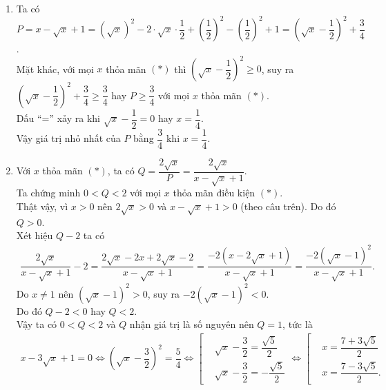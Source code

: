 \begin{bt}
{\begin{enumerate}
\begin{eqnarray*}
    &=& \dfrac{\sqrt{x}\left[(\sqrt{x})^3-1\right]}{x+\sqrt{x}+1} - \dfrac{\sqrt{x}\left(2\sqrt{x}+1\right)}{\sqrt{x}} + \dfrac{2\left(\sqrt{x}-1\right)\left(\sqrt{x}+1\right)}{\sqrt{x}-1}\\
    &=& \dfrac{\sqrt{x}\left(\sqrt{x}-1\right)\left(x+\sqrt{x}+1\right)}{x+\sqrt{x}+1} - \left(2\sqrt{x}+1\right) + 2\left(\sqrt{x}+1\right)\\
    &=& \sqrt{x}\left(\sqrt{x}-1\right)-2\sqrt{x}-1+2\sqrt{x}+2\\
    &=& x-\sqrt{x}+1.
   \end{eqnarray*}
   \item Ta có $P=x-\sqrt{x}+1 = \left(\sqrt{x}\right)^2 - 2 \cdot \sqrt{x} \cdot \dfrac{1}{2} + \left(\dfrac{1}{2}\right)^2 -  \left(\dfrac{1}{2}\right)^2 + 1 = \left(\sqrt{x}-\dfrac{1}{2}\right)^2 + \dfrac{3}{4}$.\\
   Mặt khác, với mọi $x$ thỏa mãn $(*)$ thì $\left(\sqrt{x}-\dfrac{1}{2}\right)^2 \geq 0$, suy ra $\left(\sqrt{x}-\dfrac{1}{2}\right)^2+\dfrac{3}{4} \geq \dfrac{3}{4}$ hay $P \geq \dfrac{3}{4}$ với mọi $x$ thỏa mãn $(*)$.\\
   Dấu ``='' xảy ra khi $\sqrt{x}-\dfrac{1}{2}=0$ hay $x=\dfrac{1}{4}$.\\
   Vậy giá trị nhỏ nhất của $P$ bằng $\dfrac{3}{4}$ khi $x=\dfrac{1}{4}$.
   \item Với $x$ thỏa mãn $(*)$, ta có $Q=\dfrac{2\sqrt{x}}{P} = \dfrac{2\sqrt{x}}{x-\sqrt{x}+1}$.\\
   Ta chứng minh $0<Q<2$ với mọi $x$ thỏa mãn điều kiện $(*)$.\\
   Thật vậy, vì $x>0$ nên $2\sqrt{x}>0$ và $x-\sqrt{x}+1>0$ (theo câu trên). Do đó $Q>0$.\\
   Xét hiệu $Q-2$ ta có
   \allowdisplaybreaks
   \begin{eqnarray}
   \dfrac{2\sqrt{x}}{x-\sqrt{x}+1}-2 = \dfrac{2\sqrt{x}-2x+2\sqrt{x}-2}{x-\sqrt{x}+1} = \dfrac{-2\left(x-2\sqrt{x}+1\right)}{x-\sqrt{x}+1} = \dfrac{-2\left(\sqrt{x}-1\right)^2}{x-\sqrt{x}+1}.
   \end{eqnarray}
   Do $x \neq 1$ nên $\left(\sqrt{x}-1\right)^2 > 0$, suy ra $-2\left(\sqrt{x}-1\right)^2<0$.\\
   Do đó $Q-2<0$ hay $Q<2$.\\
   Vậy ta có $0<Q<2$ và $Q$ nhận giá trị là số nguyên nên $Q=1$, tức là
   \allowdisplaybreaks
   \begin{eqnarray*}
   	x-3\sqrt{x}+1=0 \Leftrightarrow \left(\sqrt{x}-\dfrac{3}{2}\right)^2=\dfrac{5}{4} \Leftrightarrow \left[\begin{aligned}&\sqrt{x}-\dfrac{3}{2} = \dfrac{\sqrt{5}}{2} \\&\sqrt{x}-\dfrac{3}{2}=-\dfrac{\sqrt{5}}{2}\end{aligned}\right. \Leftrightarrow \left[\begin{aligned}&x=\dfrac{7+3\sqrt{5}}{2} \\&x=\dfrac{7-3\sqrt{5}}{2}.\end{aligned}\right.

\end{eqnarray*}
\end{enumerate}}
\end{bt}
